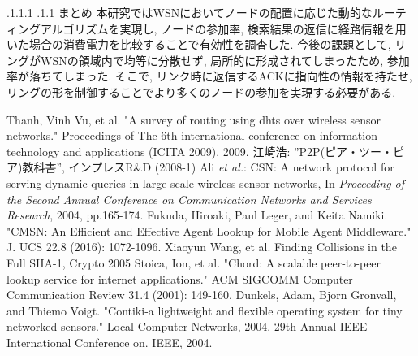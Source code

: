 \documentclass[a4paper, twocolumn]{jarticle}
\makeatletter
\def\section{\@startsection{section}{1}{\z@}%
 {.1\Cvs \@plus.1\Cdp \@minus.1\Cdp}%
 {.1\Cvs \@plus.1\Cdp}%
 {\normalfont\normalsize\bfseries}}
\makeatother
\begin{document}
\section{まとめ}
本研究ではWSNにおいてノードの配置に応じた動的なルーティングアルゴリズムを実現し,
ノードの参加率, 検索結果の返信に経路情報を用いた場合の消費電力を比較することで有効性を調査した.
今後の課題として, リングがWSNの領域内で均等に分散せず, 局所的に形成されてしまったため, 参加率が落ちてしまった.
そこで, リンク時に返信するACKに指向性の情報を持たせ, リングの形を制御することでより多くのノードの参加を実現する必要がある. 
\begin{thebibliography}{9}
{\small
Thanh, Vinh Vu, et al. "A survey of routing using dhts over wireless sensor networks." Proceedings of The 6th international conference on information technology and applications (ICITA 2009). 2009.
江崎浩: ''P2P(ピア・ツー・ピア)教科書'', インプレスR\&D (2008-1)
Ali {\em et al.}: CSN: A network protocol for serving dynamic queries in large-scale wireless sensor networks, In {\em Proceeding of the Second Annual Conference on Communication Networks and Services Research}, 2004, pp.165-174.
Fukuda, Hiroaki, Paul Leger, and Keita Namiki. "CMSN: An Efficient and Effective Agent Lookup for Mobile Agent Middleware." J. UCS 22.8 (2016): 1072-1096.
Xiaoyun Wang, et al. Finding Collisions in the Full SHA-1, Crypto 2005
Stoica, Ion, et al. "Chord: A scalable peer-to-peer lookup service for internet applications." ACM SIGCOMM Computer Communication Review 31.4 (2001): 149-160.
Dunkels, Adam, Bjorn Gronvall, and Thiemo Voigt. "Contiki-a lightweight and flexible operating system for tiny networked sensors." Local Computer Networks, 2004. 29th Annual IEEE International Conference on. IEEE, 2004.
}
\end{thebibliography}
\end{document}
